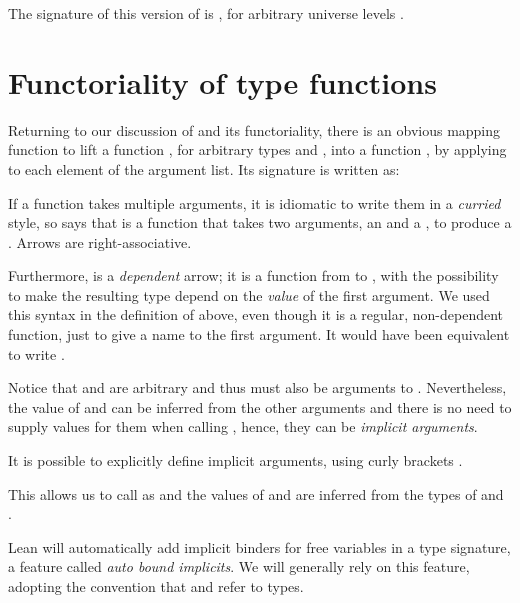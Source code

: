 The signature of this version of  is , for arbitrary universe levels .

\section{Functoriality of type functions}

Returning to our discussion of  and its functoriality, there is an obvious mapping function to lift a function , for arbitrary types  and , into a function , by applying  to each element of the argument list. Its signature is written as:
\begin{center}
\end{center}

\begin{remark}
    If a function takes multiple arguments, it is idiomatic to write them in a \emph{curried} style,
    so  says that  is a function that takes two arguments, an  and a , to produce a . Arrows are right-associative.

    Furthermore,  is a \emph{dependent} arrow; it is a function from  to , with the possibility to make the resulting type depend on the \emph{value}  of the first argument. 
    We used this syntax in the definition of  above, even though it is a regular, non-dependent function, just to give a name to the first argument. 
    It would have been equivalent to write .

    Notice that  and  are arbitrary and thus must also be arguments to . 
    Nevertheless, the value of  and  can be inferred from the other arguments and there is no need to supply values for them when calling , hence, they can be \emph{implicit arguments}. 
    
    It is possible to explicitly define implicit arguments, using curly brackets .
    \begin{center}
    \end{center}
    This allows us to call  as  and the values of  and  are inferred
    from the types of  and .

    Lean will automatically add implicit binders for free variables in a type signature,
    a feature called \emph{auto bound implicits}. 
    We will generally rely on this feature, adopting the convention that  and  refer to types.
\end{remark}

